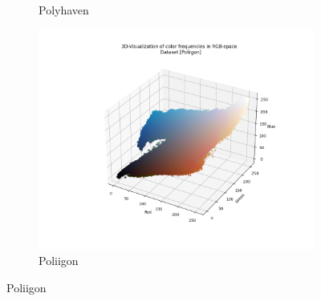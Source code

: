 \begin{figure}[h]
\begin{subfigure}{.33\textwidth}
          \caption{Polyhaven}
          \label{fig:dataset-Polyhaven}
        \end{subfigure}%
        \hfill
        \begin{subfigure}{.33\textwidth}
          \centering
          \includegraphics[width=\linewidth]{../code/dataAnalysis/output/Poliigon.png}
          \caption{Poliigon}
          \label{fig:dataset-Poliigon}
        \end{subfigure}
        
        \vspace{1cm} %
        

\end{figure}
